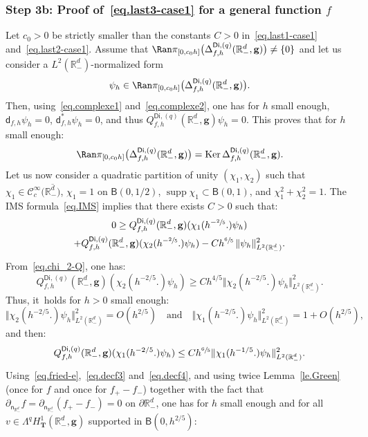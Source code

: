 \documentclass[JEP,XML,SOM,Unicode,NoEqCountersInSection,NoFloatCountersInSection,published]{cedram}
\newcommand{\quand}{\quad\text{and}\quad}
\newcommand{\mbf}[1]{\mathbf{#1}}
\let\pa\partial
\DeclareMathOperator\Ker{Ker}
\DeclareMathOperator\supp{supp}
\theoremstyle{plain}
\theoremstyle{definition}
\begin{document}
\subsubsection*{Step 3b: Proof of~\eqref{eq.last3-case1} for a general
function $f$}
Let $c_0>0$ be strictly smaller than the constants $C>0$ in~\eqref{eq.last1-case1} and~\eqref{eq.last2-case1}.
Assume that $\Ran \pi _{[0,c_0h]}\bigl(\Delta_{f,h}^{\mathsf{Di},(q)}(\mathbb R_-^d, \mbf g) \bigr) \neq \{0\}$ and let us consider a $L^2(\mathbb R_-^d) $-normalized form
\[
\psi_h\in \Ran \pi _{[0,c_0h]}\bigl(\Delta_{f,h}^{\mathsf{Di},(q)}(\mathbb R_-^d, \mbf g) \bigr).
\]
Then, using~\eqref{eq.complexe1} and~\eqref{eq.complexe2}, one has for $h$ small enough,
$\mathsf d_{f,h}\psi_h= 0$, $\mathsf d_{f,h}^*\psi_h=0$, and thus $Q_{f,h}^{\mathsf{Di},(q)}(\mathbb R_-^d, \mbf g) \psi_h=0$.
This proves that for $h$ small enough:
\[
\Ran \pi_{[0,c_0h]}\bigl(\Delta_{f,h}^{\mathsf{Di},(q)}(\mathbb R_-^d, {\mbf g})\bigr)=\Ker \Delta_{f,h}^{\mathsf{Di},(q)}(\mathbb R_-^d, {\mbf g}).
\]
Let us now consider a quadratic partition of unity $(\chi_1,\chi_2)$ such that $\chi_1\in\mathcal C_c^\infty (\overline {\mathbb R_-^d)}$, $\chi_1=1$ on $\mathsf B(0,1/2)$, $\supp \chi_1\subset \mathsf B(0,1)$, and $\chi_1^2+\chi_2^2=1$.
The IMS formula~\eqref{eq.IMS}
implies that there exists $C>0$ such that:
\begin{multline}
\label{eq.ast1}
0\ge Q_{f,h}^{\mathsf{Di},(q)}(\mathbb R_-^d, \mbf g)
(\chi_1(h^{-\sfrac 25}.) \psi_h)\\
+Q_{f,h}^{\mathsf{Di},(q)}(\mathbb R^d_-, \mbf g)(\chi_2(h^{-\sfrac 25}.) \psi_h) -C h^{\sfrac 65}\, \Vert \psi_h \Vert_{L^2(\mathbb R_-^d)}^2.
\end{multline}
From~\eqref{eq.chi_2-Q}, one has:
\[
Q_{f,h}^{\mathsf{Di},(q)}(\mathbb R^d_-, \mbf g)(\chi_2(h^{-2/5 }.) \psi_h)\ge Ch^{4/5} \Vert \chi_2(h^{-2/5 }.) \psi_h \Vert_{L^2(\mathbb R_-^d)}^2.
\]
Thus, it~holds for $h>0$ small enough:
\begin{equation}\label{norme-chi}
\Vert \chi_2(h^{-2/5 }.) \psi_h \Vert_{L^2(\mathbb R_-^d)}^2 =O(h^{2/5 }) \quand \Vert \chi_1(h^{-2/5 }.) \psi_h \Vert_{L^2(\mathbb R_-^d)}^2=1+O (h^{2/5 }),
\end{equation}
and then:
\begin{equation}\label{quad-chi1}
Q_{f,h}^{\mathsf{Di},(q)}(\mathbb R^d_-, { \mbf g}) (\chi_1(h^{-2/5 }.) \psi_h)\le Ch^{\sfrac 65} \Vert \chi_1(h^{-1/5 }.) \psi_h \Vert_{L^2(\mathbb R_-^d)}^2.
\end{equation}
Using~\eqref{eq.fried-e},~\eqref{eq.decf3} and~\eqref{eq.decf4}, and using twice Lemma~\ref{le.Green} (once for $f$ and once for $f_+-f_-$) together with the fact that $ \partial_{\mathsf n_{\mathbb R^d_-}}f= \partial_{\mathsf n_{\mathbb R^d_-}}(f_+-f_-)=0$ on $\pa \mathbb R^d_-$, one has for $h$ small enough and for all $v\in \Lambda^qH^1_{\mbf T}(\mathbb R^d_-, \mbf g) $ supported in $\mathsf B(0,h^{2/5})$:
\end{document}
